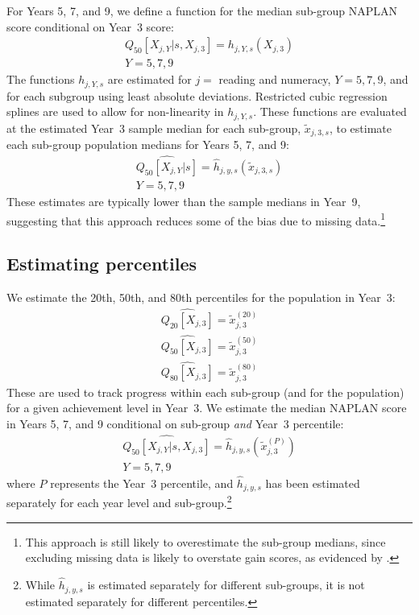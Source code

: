 For Years 5, 7, and 9, we define a function for the median sub-group NAPLAN score conditional on \mbox{Year 3} score:
\begin{equation} \begin{array}{c}
Q_{50}\left[X_{j,Y}|s,X_{j,3}\right] = h_{j,Y,s}\left(X_{j,3}\right) \\
Y = 5,7,9
\end{array} \end{equation}
The functions $h_{j,Y,s}$ are estimated for $j = $ reading and numeracy, $Y = 5, 7, 9$, and for each subgroup using least absolute deviations. Restricted cubic regression splines are used to allow for non-linearity in $h_{j,Y,s}$. These functions are evaluated at the estimated \mbox{Year 3} sample median for each sub-group, $\tilde{x}_{j,3,s}$, to estimate each sub-group population medians for Years 5, 7, and 9:
\begin{equation} \begin{array}{c}
\widehat{Q_{50}\left[X_{j,Y}|s\right]} = \widehat{h}_{j,y,s}\left(\tilde{x}_{j,3,s}\right) \\
Y = 5,7,9
\end{array} \end{equation}
These estimates are typically lower than the sample medians in \mbox{Year 9}, suggesting that this approach reduces some of the bias due to missing data.\footnote{This approach is still likely to overestimate the sub-group medians, since excluding missing data is likely to overstate gain scores, as evidenced by .}

\newpage
\subsection{Estimating percentiles}

We estimate the 20th, 50th, and 80th percentiles for the population in \mbox{Year 3}:
\begin{equation} \begin{array}{c}
\widehat{Q_{20}\left[X_{j,3}\right]} = \tilde{x}^{(20)}_{j,3} \\
\widehat{Q_{50}\left[X_{j,3}\right]} = \tilde{x}^{(50)}_{j,3} \\
\widehat{Q_{80}\left[X_{j,3}\right]} = \tilde{x}^{(80)}_{j,3}
\end{array} \end{equation}
These are used to track progress within each sub-group (and for the population) for a given achievement level in \mbox{Year 3}. We estimate the median NAPLAN score in Years 5, 7, and 9 conditional on sub-group \textit{and} \mbox{Year 3} percentile:
\begin{equation} \begin{array}{c}
\widehat{Q_{50}\left[X_{j,Y}|s,X_{j,3}\right]} = \widehat{h}_{j,y,s}\left(\tilde{x}^{(P)}_{j,3}\right) \\
Y = 5,7,9
\end{array} \end{equation}
where $P$ represents the \mbox{Year 3} percentile, and $\widehat{h}_{j,y,s}$ has been estimated separately for each year level and sub-group.\footnote{While $\widehat{h}_{j,y,s}$ is estimated separately for different sub-groups, it is not estimated separately for different percentiles.}

